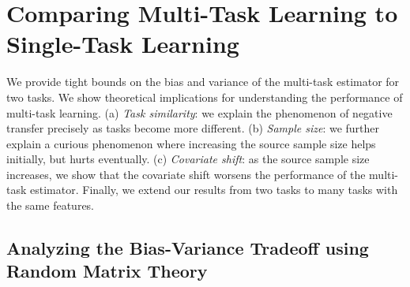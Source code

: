 \section{Comparing Multi-Task Learning to Single-Task Learning}\label{sec_insight}

We provide tight bounds on the bias and variance of the multi-task estimator for two tasks.
We show theoretical implications for understanding the performance of multi-task learning.
(a) \textit{Task similarity}: we explain the phenomenon of negative transfer precisely as tasks become more different.
(b) \textit{Sample size}: we further explain a curious phenomenon where increasing the source sample size helps initially, but hurts eventually.
(c) \textit{Covariate shift}: as the source sample size increases, we show that the covariate shift worsens the performance of the multi-task estimator.
Finally, we extend our results from two tasks to many tasks with the same features.

\subsection{Analyzing the Bias-Variance Tradeoff using Random Matrix Theory}\label{sec_main}

